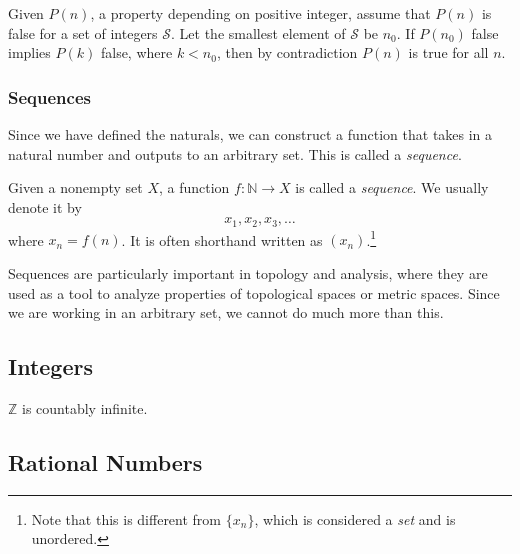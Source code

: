     \begin{theorem}
      Given $P(n)$, a property depending on positive integer, assume that $P(n)$ is false for a set of integers $\mathcal{S}$. Let the smallest element of $\mathcal{S}$ be $n_0$. If $P(n_0)$ false implies $P(k)$ false, where $k < n_0$, then by contradiction $P(n)$ is true for all $n$. 
    \end{theorem}

  \subsubsection{Sequences} 

    Since we have defined the naturals, we can construct a function that takes in a natural number and outputs to an arbitrary set. This is called a \textit{sequence}. 

    \begin{definition}[Sequence]
      \label{def:sequence}
      Given a nonempty set $X$, a function $f: \mathbb{N} \rightarrow X$ is called a \textit{sequence}. We usually denote it by 
      \begin{equation}
        x_1, x_2, x_3, \ldots
      \end{equation}
      where $x_n = f(n)$. It is often shorthand written as $(x_n)$.\footnote{Note that this is different from $\{x_n\}$, which is considered a \textit{set} and is unordered.}
    \end{definition}

    Sequences are particularly important in topology and analysis, where they are used as a tool to analyze properties of topological spaces or metric spaces. Since we are working in an arbitrary set, we cannot do much more than this.   
    
\subsection{Integers} 

  \begin{theorem}[Countability]
    $\mathbb{Z}$ is countably infinite. 
  \end{theorem}

\subsection{Rational Numbers} 

